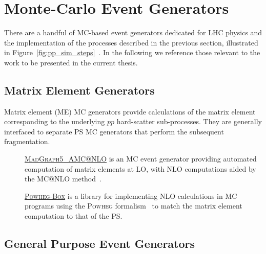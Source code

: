 %
%

\section{Monte-Carlo Event Generators}
\label{sec:mc_gen}

There are a handful of MC-based event generators dedicated for LHC physics
and the implementation of the processes described in the previous section, illustrated
in Figure~\ref{fig:pp_sim_steps}~\cite{Buckley:2011ms}.
In the following we reference those relevant to the work to be presented in the current
thesis.

\subsection{Matrix Element Generators}
\label{sec:mc_gen_me}

Matrix element (ME) MC generators provide calculations of the matrix element corresponding
to the underlying $pp$ hard-scatter sub-processes.
They are generally interfaced to separate PS MC generators that perform the subsequent fragmentation.

\begin{description}
    \item[] \underline{\textsc{MadGraph5\_AMC@NLO}} \cite{MGFive} is an MC event generator providing automated
        computation of matrix elements at LO, with NLO computations aided by the MC@NLO method~\cite{AMCNLO}.
    \item[] \underline{\textsc{Powheg-Box}} \cite{POWHEGBOX} is a library for implementing NLO calculations in
        MC programs using the \textsc{Powheg} formalism~\cite{POWHEGMETHOD} to match the matrix element
        computation to that of the PS.
\end{description}

\subsection{General Purpose Event Generators}
\label{sec:mc_gen_gen_purpose}

